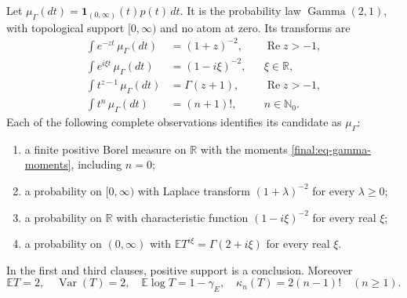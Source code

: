 \begin{theorem}
\label{final:P1}
Let $\mu_\Gamma(dt)=\mathbf 1_{(0,\infty)}(t)p(t)\,dt$.
It is the probability law $\operatorname{Gamma}(2,1)$, with topological
support $[0,\infty)$ and no atom at zero.  Its transforms are
\begin{align}
 \int e^{-zt}\,\mu_\Gamma(dt)&=(1+z)^{-2},
       &&\operatorname{Re}z>-1,\label{final:eq-gamma-laplace}\\
 \int e^{i\xi t}\,\mu_\Gamma(dt)&=(1-i\xi)^{-2},
       &&\xi\in\mathbb R,\label{final:eq-gamma-characteristic}\\
 \int t^{z-1}\,\mu_\Gamma(dt)&=\Gamma(z+1),
       &&\operatorname{Re}z>-1,\label{final:eq-gamma-mellin}\\
 \int t^n\,\mu_\Gamma(dt)&=(n+1)!,
       &&n\in\mathbb N_0.\label{final:eq-gamma-moments}
\end{align}
Each of the following complete observations identifies its candidate
as $\mu_\Gamma$:
\begin{enumerate}
\item a finite positive Borel measure on $\mathbb R$ with the moments
      \eqref{final:eq-gamma-moments}, including $n=0$;
\item a probability on $[0,\infty)$ with Laplace transform
      $(1+\lambda)^{-2}$ for every $\lambda\geq0$;
\item a probability on $\mathbb R$ with characteristic function
      $(1-i\xi)^{-2}$ for every real $\xi$;
\item a probability on $(0,\infty)$ with
      $\mathbb E T^{i\xi}=\Gamma(2+i\xi)$ for every real $\xi$.
\end{enumerate}
In the first and third clauses, positive support is a conclusion.
Moreover
\[
 \mathbb ET=2,\quad \operatorname{Var}(T)=2,\quad
 \mathbb E\log T=1-\gamma_E,\quad
 \kappa_n(T)=2(n-1)!\quad(n\geq1).
\]
\end{theorem}
